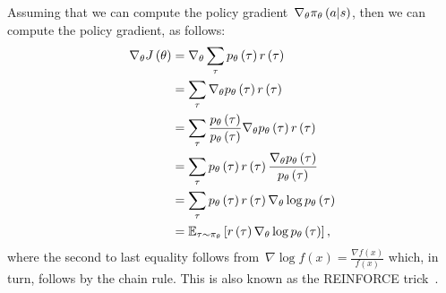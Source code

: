 Assuming that we can compute the policy gradient~${\nabla_{\policyparameter}\policy_{\policyparameter}\left(\action\middle\vert\state\right)}$, then we can compute the policy gradient, as follows:
\begin{align} \label{eq:obj_function_derivative}
	\nabla_{\theta}J\left(\theta\right)
		&=\nabla_{\theta}\sum_{\tau}p_{\theta}\left(\tau\right)r\left(\tau\right) \notag \\
		&=\sum_{\tau}\nabla_{\theta}p_{\theta}\left(\tau\right)r\left(\tau\right) \notag \\
		&=\sum_{\tau}\frac{p_{\theta}\left(\tau\right)}{p_{\theta}\left(\tau\right)}\nabla_{\theta}p_{\theta}\left(\tau\right)r\left(\tau\right) \notag \\
		&=\sum_{\tau}p_{\theta}\left(\tau\right)r\left(\tau\right)\frac{\nabla_{\theta}p_{\theta}\left(\tau\right)}{p_{\theta}\left(\tau\right)} \notag \\
		&=\sum_{\tau}p_{\theta}\left(\tau\right)r\left(\tau\right)\nabla_{\theta}\log p_{\theta}\left(\tau\right) \notag \\
		&=\mathbb{E}_{\tau\sim\pi_{\theta}}\left[r\left(\tau\right)\nabla_{\theta}\log p_{\theta}\left(\tau\right)\right],
\end{align}
where the second to last equality follows from~${\nabla\log{f\left(x\right)}=\frac{\nabla{f\left(x\right)}}{f\left(x\right)}}$ which, in turn, follows by the chain rule. This is also known as the REINFORCE trick~\cite{williams1992reinforce}.

